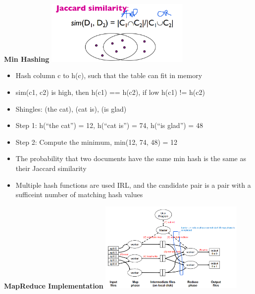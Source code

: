 \documentclass[10pt, landscape]{article}
\begin{document}
\begin{multicols}{4}
\textbf{Min Hashing}
\includegraphics*[width=7cm]{jaccard.png}
\begin{itemize}
  \item Hash column c to h(c), such that the table can fit in memory
  \item sim(c1, c2) is high, then h(c1) == h(c2), if low h(c1) != h(c2)
  \item Shingles:  { (the cat), (cat is), (is glad) }
  \item Step 1: h(“the cat”) = 12, h(“cat is”) = 74, h(“is glad”) = 48
  \item Step 2: Compute the minimum, min(12, 74, 48) = 12
  \item The probability that two documents have the same min hash is the same as their Jaccard similarity
  \item Multiple hash functions are used IRL, and the candidate pair is a pair with a sufficeint number of matching hash values
\end{itemize}

\textbf{MapReduce Implementation}
\includegraphics*[width=7cm]{map_reduce_impl.png}


\end{multicols}
\end{document}
